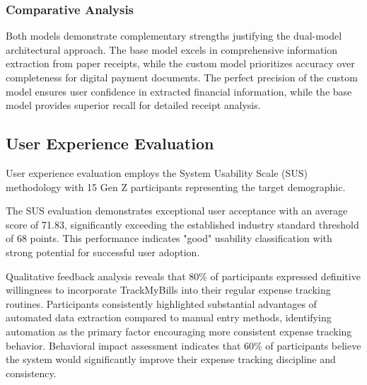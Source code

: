 \subsubsection{Comparative Analysis}
Both models demonstrate complementary strengths justifying the dual-model architectural approach. The base model excels in comprehensive information extraction from paper receipts, while the custom model prioritizes accuracy over completeness for digital payment documents. The perfect precision of the custom model ensures user confidence in extracted financial information, while the base model provides superior recall for detailed receipt analysis.

\subsection{User Experience Evaluation}
User experience evaluation employs the System Usability Scale (SUS) methodology with 15 Gen Z participants representing the target demographic.


The SUS evaluation demonstrates exceptional user acceptance with an average score of 71.83, significantly exceeding the established industry standard threshold of 68 points. This performance indicates "good" usability classification with strong potential for successful user adoption.

Qualitative feedback analysis reveals that 80\% of participants expressed definitive willingness to incorporate TrackMyBills into their regular expense tracking routines. Participants consistently highlighted substantial advantages of automated data extraction compared to manual entry methods, identifying automation as the primary factor encouraging more consistent expense tracking behavior. Behavioral impact assessment indicates that 60\% of participants believe the system would significantly improve their expense tracking discipline and consistency.

